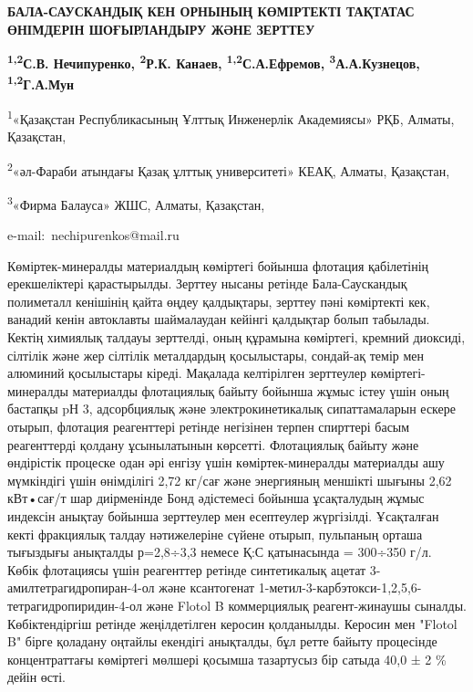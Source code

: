 \begin{center}
{\large\bfseries БАЛА-САУСКАНДЫҚ КЕН ОРНЫНЫҢ КӨМІРТЕКТІ ТАҚТАТАС ӨНІМДЕРІН
ШОҒЫРЛАНДЫРУ ЖӘНЕ ЗЕРТТЕУ}

{\bfseries \textsuperscript{1,2}С.В. Нечипуренко\envelope, \textsuperscript{2}Р.К.
Канаев, \textsuperscript{1,2}С.А.Ефремов,
\textsuperscript{3}А.А.Кузнецов, \textsuperscript{1,2}Г.А.Мун}

\textsuperscript{1}«Қазақстан Республикасының Ұлттық Инженерлік
Академиясы» РҚБ, Алматы, Қазақстан,

\textsuperscript{2}«әл-Фараби атындағы Қазақ ұлттық университеті» КЕАҚ,
Алматы, Қазақстан,

\textsuperscript{3}«Фирма Балауса» ЖШС, Алматы, Қазақстан,

e-mail:~nechipurenkos@mail.ru
\end{center}

Көміртек-минералды материалдың көміртегі бойынша флотация қабілетінің
ерекшеліктері қарастырылды. Зерттеу нысаны ретінде Бала-Саускандық
полиметалл кенішінің қайта өңдеу қалдықтары, зерттеу пәні көміртекті
кек, ванадий кенін автоклавты шаймалаудан кейінгі қалдықтар болып
табылады. Кектің химиялық талдауы зерттелді, оның құрамына көміртегі,
кремний диоксиді, сілтілік және жер сілтілік металдардың қосылыстары,
сондай-ақ темір мен алюминий қосылыстары кіреді. Мақалада келтірілген
зерттеулер көміртегі-минералды материалды флотациялық байыту бойынша
жұмыс істеу үшін оның бастапқы pН 3, адсорбциялық және
электрокинетикалық сипаттамаларын ескере отырып, флотация реагенттері
ретінде негізінен терпен спирттері басым реагенттерді қолдану
ұсынылатынын көрсетті. Флотациялық байыту және өндірістік процеске одан
әрі енгізу үшін көміртек-минералды материалды ашу мүмкіндігі үшін
өнімділігі 2,72 кг/сағ және энергияның меншікті шығыны 2,62 кВт•сағ/т
шар диірменінде Бонд әдістемесі бойынша ұсақталудың жұмыс индексін
анықтау бойынша зерттеулер мен есептеулер жүргізілді. Ұсақталған кекті
фракциялық талдау нәтижелеріне сүйене отырып, пульпаның орташа тығыздығы
анықталды р=2,8÷3,3 немесе Қ:С қатынасында = 300÷350 г/л. Көбік
флотациясы үшін реагенттер ретінде синтетикалық ацетат
3-амилтетрагидропиран-4-ол және ксантогенат
1-метил-3-карбэтокси-1,2,5,6-тетрагидропиридин-4-ол және Flotol B
коммерциялық реагент-жинаушы сыналды. Көбіктендіргіш ретінде
жеңілдетілген керосин қолданылды. Керосин мен "Flotol B" бірге қоладану
оңтайлы екендігі анықталды, бұл ретте байыту процесінде концентраттағы
көміртегі мөлшері қосымша тазартусыз бір сатыда 40,0 ± 2 \% дейін өсті.

